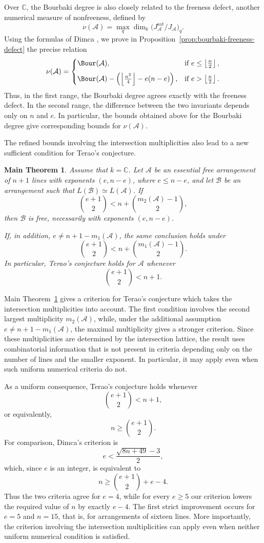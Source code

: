 \documentclass[11pt]{amsart}   %
\newtheorem{mthm}{Main Theorem}
\theoremstyle{definition}
\def\NZQ{\mathbb}               %
\def\CC{{\NZQ C}}
\def\A{{\mathcal A}}
\def\B{{\mathcal B}}
\begin{document}
Over $\CC$, the Bourbaki degree is also closely related to the freeness defect,
another numerical measure of nonfreeness, defined by
\[
\nu(\A)
=
\max_q\dim_k
\bigl(J_\A^{\mathrm{sat}}/J_\A\bigr)_q.
\]
Using the formulas of Dimca
\cite[Theorem~1.7]{Dimca-minimal-Tjurina}, we prove in
Proposition~\ref{prop:bourbaki-freeness-defect} the precise relation
\[
\nu(\A)
=
\begin{cases}
\Bour(\A),
&\text{if }e\leq\left\lfloor\frac n2\right\rfloor,\\[2mm]
\Bour(\A)
-\left(
\left\lfloor\frac{n^2}{4}\right\rfloor-e(n-e)
\right),
&\text{if }e>\left\lfloor\frac n2\right\rfloor.
\end{cases}
\]
Thus, in the first range, the Bourbaki degree agrees exactly with the
freeness defect. In the second range, the difference between the two
invariants depends only on $n$ and $e$. In particular, the bounds
obtained above for the Bourbaki degree give corresponding bounds for
$\nu(\A)$.

The refined bounds involving the intersection multiplicities also
lead to a new sufficient condition for Terao's conjecture.

\begin{mthm}
\label{main:terao}
Assume that $k=\CC$. Let $\A$ be an essential free arrangement of $n+1$ lines with
exponents $(e,n-e)$, where $e\leq n-e$, and let $\B$ be an
arrangement such that $L(\B)\simeq L(\A)$. If
\[
\binom{e+1}{2}
<
n+\binom{m_2(\A)-1}{2},
\]
then $\B$ is free, necessarily with exponents $(e,n-e)$.

If, in addition, $e\neq n+1-m_1(\A)$, the same conclusion holds under
\[
\binom{e+1}{2}
<
n+\binom{m_1(\A)-1}{2}.
\]
In particular, Terao's conjecture holds for $\A$ whenever
\[
\binom{e+1}{2}<n+1.
\]
\end{mthm}

Main Theorem~\ref{main:terao} gives a criterion for Terao's conjecture
which takes the intersection multiplicities into account. The first
condition involves the second largest multiplicity $m_2(\A)$, while,
under the additional assumption $e\neq n+1-m_1(\A)$, the maximal
multiplicity gives a stronger criterion. Since these multiplicities
are determined by the intersection lattice, the result uses
combinatorial information that is not present in criteria depending
only on the number of lines and the smaller exponent. In particular,
it may apply even when such uniform numerical criteria do not.

As a uniform consequence, Terao's conjecture holds whenever
\[
\binom{e+1}{2}<n+1,
\]
or equivalently,
\[
n\geq\binom{e+1}{2}.
\]
For comparison, Dimca's criterion
\cite[Corollary~3.1]{Dimca-minimal-Tjurina} is
\[
e<\frac{\sqrt{8n+49}-3}{2},
\]
which, since $e$ is an integer, is equivalent to
\[
n\geq\binom{e+1}{2}+e-4.
\]
Thus the two criteria agree for $e=4$, while for every $e\geq5$
our criterion lowers the required value of $n$ by exactly $e-4$.
The first strict improvement occurs for $e=5$ and $n=15$, that is,
for arrangements of sixteen lines. More importantly, the criterion
involving the intersection multiplicities can apply even when neither
uniform numerical condition is satisfied.
\end{document}
